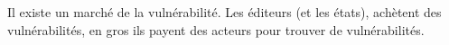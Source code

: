 Il existe un marché de la vulnérabilité. Les éditeurs (et les états), achètent des vulnérabilités, en gros ils payent des acteurs pour trouver de vulnérabilités.




 

